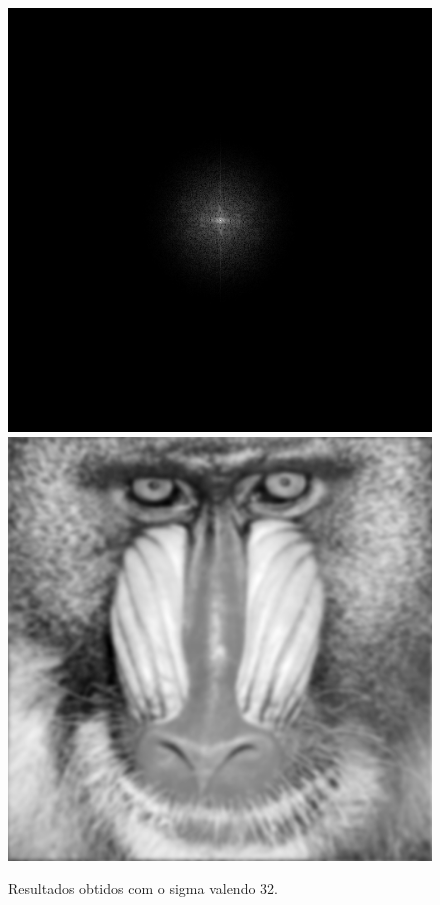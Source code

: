 \documentclass[twoside,twocolumn]{article}
\begin{document}
\begin{figure}[H]
\begin{center}
	\includegraphics[scale=.17]{figures/baboon_mag_filter_32.png}
	\includegraphics[scale=.17]{figures/baboon_result_32.png}
\caption{Resultados obtidos com o sigma valendo 32.} \label{mag_32}
\end{center}
\end{figure}
\end{document}
